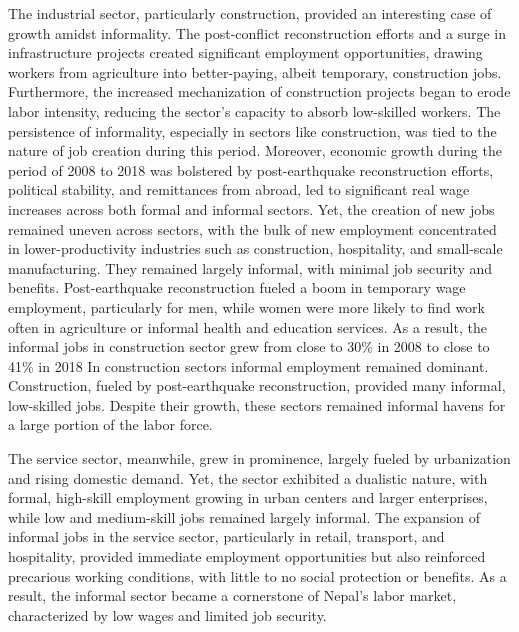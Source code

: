 The industrial sector, particularly construction, provided an interesting case of growth amidst informality. The post-conflict reconstruction efforts and a surge in infrastructure projects created significant employment opportunities, drawing workers from agriculture into better-paying, albeit temporary, construction jobs. Furthermore, the increased mechanization of construction projects began to erode labor intensity, reducing the sector's capacity to absorb low-skilled workers. The persistence of informality, especially in sectors like construction, was tied to the nature of job creation during this period. Moreover, economic growth during the period of 2008 to 2018 was bolstered by post-earthquake reconstruction efforts, political stability, and remittances from abroad, led to significant real wage increases across both formal and informal sectors. Yet, the creation of new jobs remained uneven across sectors, with the bulk of new employment concentrated in lower-productivity industries such as construction, hospitality, and small-scale manufacturing. They remained largely informal, with minimal job security and benefits. Post-earthquake reconstruction fueled a boom in temporary wage employment, particularly for men, while women were more likely to find work often in agriculture or informal health and education services. As a result, the informal jobs in construction sector grew from close to 30\% in 2008 to close to 41\% in 2018  In construction sectors informal employment remained dominant. Construction, fueled by post-earthquake reconstruction, provided many informal, low-skilled jobs. Despite their growth, these sectors remained informal havens for a large portion of the labor force.


The service sector, meanwhile, grew in prominence, largely fueled by urbanization and rising domestic demand. Yet, the sector exhibited a dualistic nature, with formal, high-skill employment growing in urban centers and larger enterprises, while low and medium-skill jobs remained largely informal. The expansion of informal jobs in the service sector, particularly in retail, transport, and hospitality, provided immediate employment opportunities but also reinforced precarious working conditions, with little to no social protection or benefits. As a result, the informal sector became a cornerstone of Nepal's labor market, characterized by low wages and limited job security.

